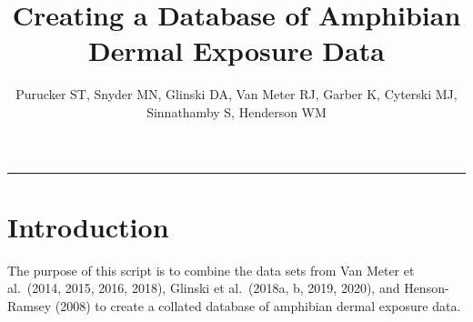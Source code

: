\documentclass[
]{article}
\title{Creating a Database of Amphibian Dermal Exposure Data}
\author{Purucker ST, Snyder MN, Glinski DA, Van Meter RJ, Garber K, Cyterski MJ,
Sinnathamby S, Henderson WM}
\date{}
\begin{document}
\maketitle

\begin{center}\rule{0.5\linewidth}{0.5pt}\end{center}

\hypertarget{introduction}{%
\section{\texorpdfstring{\textbf{Introduction}}{Introduction}}\label{introduction}}

The purpose of this script is to combine the data sets from Van Meter et
al.~(2014, 2015, 2016, 2018), Glinski et al.~(2018a, b, 2019, 2020), and
Henson-Ramsey (2008) to create a collated database of amphibian dermal
exposure data.
\end{document}
